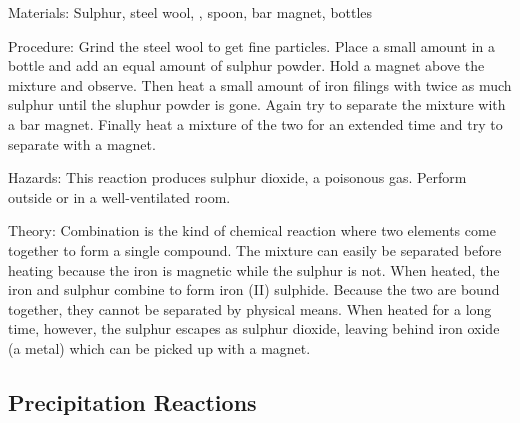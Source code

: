 \begin{multicols}{2}

\begin{description*}
\item[Materials:]{Sulphur, steel wool, , spoon, bar magnet, bottles}
\item[Procedure:]{Grind the steel wool to get fine particles. Place a small amount in a bottle and add an equal amount of sulphur powder. Hold a magnet above the mixture and observe. Then heat a small amount of iron filings with twice as much sulphur until the sluphur powder is gone. Again try to separate the mixture with a bar magnet. Finally heat a mixture of the two for an extended time and try to separate with a magnet.}
\item[Hazards:]{This reaction produces sulphur dioxide, a poisonous gas. Perform outside or in a well-ventilated room.}
\item[Theory:]{Combination is the kind of chemical reaction where two elements come
together to form a single compound. The mixture can easily be separated before heating because the iron is magnetic while the sulphur is not. When heated, the iron and sulphur combine to form iron (II) sulphide. Because the two are bound together, they cannot be separated by physical means. When heated for a long time, however, the sulphur escapes as sulphur dioxide, leaving behind iron oxide (a metal) which can be picked up with a magnet.}
\end{description*}

\subsection{Precipitation Reactions}



\end{multicols}
